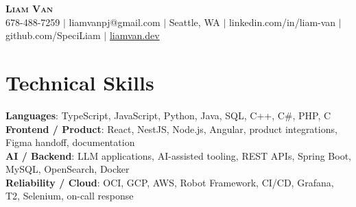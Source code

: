 \documentclass[letterpaper,11pt]{article}
\begin{document}

%
\begin{center}
    \textbf{\Huge \scshape Liam Van} \\ \vspace{1pt}
    \small 678-488-7259 $|$ \small {liamvanpj@gmail.com} $|$ Seattle, WA
 {{$|$ linkedin.com/in/liam-van} {$|$ github.com/SpeciLiam} {$|$ \href{https://liamvan.dev}{liamvan.dev}}}

\end{center}

\section{Technical Skills}
 \begin{itemize}[leftmargin=0.15in, label={}]
    \small{\item{
     \textbf{Languages}{: TypeScript, JavaScript, Python, Java, SQL, C++, C\#, PHP, C} \\
     \textbf{Frontend / Product}{: React, NestJS, Node.js, Angular, product integrations, Figma handoff, documentation} \\
     \textbf{AI / Backend}{: LLM applications, AI-assisted tooling, REST APIs, Spring Boot, MySQL, OpenSearch, Docker} \\
     \textbf{Reliability / Cloud}{: OCI, GCP, AWS, Robot Framework, CI/CD, Grafana, T2, Selenium, on-call response} \\
    }}
 \end{itemize}
%

\end{document}
